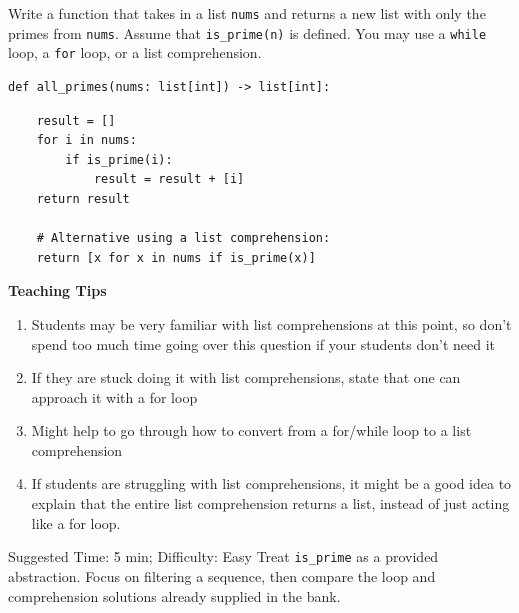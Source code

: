 \begin{blocksection}
\question Write a function that takes in a list \lstinline{nums} and returns a
new list with only the primes from \lstinline{nums}. Assume that
\lstinline{is_prime(n)} is defined. You may use a \lstinline{while} loop, a
\lstinline{for} loop, or a list comprehension.


\begin{lstlisting}
def all_primes(nums: list[int]) -> list[int]:
\end{lstlisting}

\begin{solution}[2in]
\begin{lstlisting}
    result = []
    for i in nums:
        if is_prime(i):
            result = result + [i]
    return result

    # Alternative using a list comprehension:
    return [x for x in nums if is_prime(x)]
\end{lstlisting}
\end{solution}
\end{blocksection}

\begin{questionmeta}
    \textbf{Teaching Tips}
    \begin{enumerate}
            \item Students may be very familiar with list comprehensions at this point, so don’t spend too much time going over this question if your students don’t need it
            \item If they are stuck doing it with list comprehensions, state that one can approach it with a for loop
            \item Might help to go through how to convert from a for/while loop to a list comprehension
            \item If students are struggling with list comprehensions, it might be a good idea to explain that the entire list comprehension returns a list, instead of just acting like a for loop.
    \end{enumerate}
\end{questionmeta}

\begin{questionmeta}
    Suggested Time: 5 min; Difficulty: Easy
    Treat \lstinline{is_prime} as a provided abstraction. Focus on filtering a sequence, then compare the loop and comprehension solutions already supplied in the bank.
\end{questionmeta}

